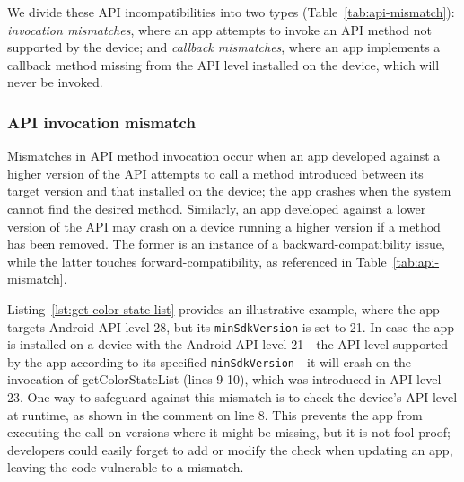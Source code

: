 We divide these API incompatibilities into two types
(Table~\ref{tab:api-mismatch}): {\it invocation
mismatches}, where an app attempts to invoke an API
method not supported by the device; and {\it callback
mismatches}, where an app implements a callback method
missing from the API level installed on the device,
which will never be invoked.

\subsubsection{API invocation mismatch}

Mismatches in API method invocation occur when an app
developed against a higher version of the API attempts to
call a method introduced between its target version and that
installed on the device; the app crashes when the system
cannot find the desired method. Similarly, an app developed
against a lower version of the API may crash on a device
running a higher version if a method has been removed.
The former is an instance of a backward-compatibility issue, while the latter touches forward-compatibility, as referenced in Table~\ref{tab:api-mismatch}.

\begin{figure}[b]%
    \vspace{-0.8cm}    
    
\end{figure}

 

Listing~\ref{lst:get-color-state-list} provides an illustrative example, where
the app targets Android API level 28, but its {\tt minSdkVersion} is set to 21.
In case the app is installed on a device with the Android API level 
21---the API level supported by the app according to 
its specified {\tt minSdkVersion}---it will crash on 
the invocation of {\sf getColorStateList}
(lines 9-10), which was introduced in API level 23.
One way to safeguard against this mismatch is to check the device's
API level at runtime, as shown in the comment on line 8.
This prevents the app from executing the call on versions
where it might be missing, but it is not fool-proof;
developers could easily forget to add or modify the check
when updating an app, leaving the code vulnerable to a
mismatch.



